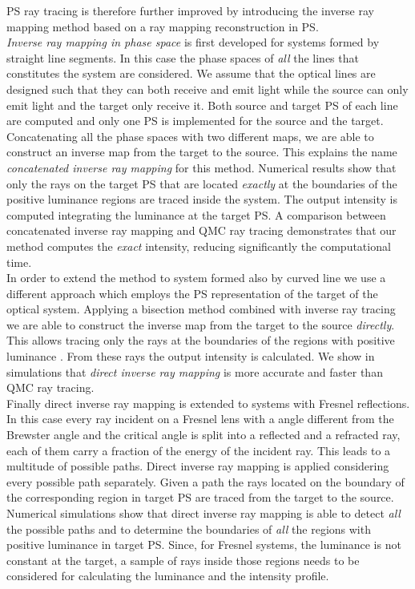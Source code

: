 PS ray tracing is therefore further improved by introducing the inverse ray mapping method based on a ray mapping reconstruction in PS. 
\\ \indent
\textit{Inverse ray mapping in phase space} is first developed for systems formed by straight line segments. In this case the phase spaces of \textit{all} the lines that constitutes the system are considered. We assume that the optical lines are designed such that they can both receive and emit light while the source can only emit light and the target only receive it. Both source and target PS of each line are computed and only one PS is implemented for the source and the target. Concatenating all the phase spaces with two different maps, we are able to construct an inverse map from the target to the source. This explains the name \textit{concatenated inverse ray mapping} for this method. Numerical results show that only the rays on the target PS that are located \textit{exactly} at the boundaries of the positive luminance regions are traced inside the system. The output intensity is computed integrating the luminance at the target PS. A comparison between concatenated inverse ray mapping and QMC ray tracing demonstrates that our method computes the \textit{exact} intensity, reducing significantly the computational time. \\ \indent In order to extend the method to system formed also by curved line we use a different approach which employs the PS representation of the target of the optical system. Applying a bisection method combined with inverse ray tracing we are able to construct the inverse map from the target to the source \textit{directly}. This allows tracing only the rays at the boundaries of the regions with positive luminance \cite{filosa2017inverse}. From these rays the output intensity is calculated. We show in simulations that \textit{direct inverse ray mapping} is more accurate and faster than QMC ray tracing. \\ \indent Finally direct inverse ray mapping is extended to systems with Fresnel reflections. In this case every ray incident on a Fresnel lens with a angle different from the Brewster angle and the critical angle is split into a reflected and a refracted ray, each of them carry a fraction of the energy of the incident ray. This leads to a multitude of possible paths. Direct inverse ray mapping is applied considering every possible path separately. Given a path the rays located on the boundary of the corresponding region in target PS are traced from the target to the source. Numerical simulations show that direct inverse ray mapping is able to detect \textit{all} the possible paths and to determine the boundaries of \textit{all} the regions with positive luminance in target PS. Since, for Fresnel systems, the luminance is not constant at the target, a sample of rays inside those regions needs to be considered for calculating the luminance and the intensity profile.
